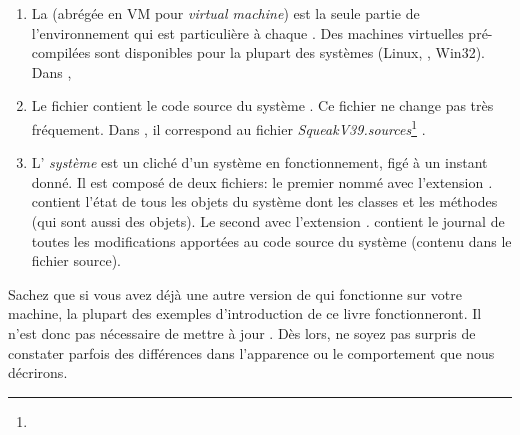 \documentclass[a4paper,10pt,twoside]{book}
\begin{document}
\begin{enumerate}

\item La  (abrégée en VM pour
  \emph{virtual machine}) est la seule partie de l'environnement qui
  est particulière à chaque . Des machines virtuelles pré-compilées sont disponibles pour la plupart des
  systèmes (Linux, \macosx, Win32). Dans ,  %

  \item Le fichier  contient le code source du système
    \pharo. Ce fichier ne change pas très fréquement. Dans , il
    correspond au fichier
    \emph{SqueakV39.sources}\footnote{}
.

\item L' \emph{système}  est un cliché d'un système
  \pharo{} en fonctionnement, figé à un instant donné. 
Il est composé de deux fichiers: le premier nommé avec l'extension
\emph{.} contient l'état de tous les objets du système
dont les classes et les méthodes (qui sont aussi des objets). 
Le second avec l'extension \emph{.} contient
le journal de toutes les modifications apportées au code source du
système (contenu dans le fichier source).
\end{enumerate}



Sachez que si vous avez déjà une autre version de \pharo qui fonctionne sur votre
machine, la plupart des exemples d'introduction de ce livre
fonctionneront. Il n'est donc pas nécessaire de mettre à jour \pharo.
Dès lors, ne soyez pas surpris de constater parfois des différences dans l'apparence ou le comportement que nous décrirons.
\end{document}
